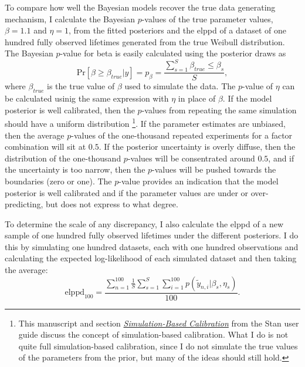 To compare how well the Bayesian models recover the true data generating mechanism, I calculate the Bayesian $p$-values of the true parameter values, $\beta = 1.1$ and $\eta = 1$, from the fitted posteriors and the elppd of a dataset of one hundred fully observed lifetimes generated from the true Weibull distribution. The Bayesian $p$-value for beta is easily calculated using the posterior draws as \citep{BDA2020}
\begin{equation*}
    \text{Pr}\left[\beta \ge \beta_{true}|y\right] = p_{\beta} = \frac{\sum^{S}_{s = 1}{\beta_{true} \le \beta_s}}{S},
\end{equation*}
where $\beta_{true}$ is the true value of $\beta$ used to simulate the data. The $p$-value of $\eta$ can be calculated usinig the same expression with $\eta$ in place of $\beta$. If the model posterior is well calibrated, then the $p$-values from repeating the same simulation should have a uniform distribution \citep{talts2018, stan_user_guide2024}\footnote{This manuscript and section \href{https://mc-stan.org/docs/stan-users-guide/simulation-based-calibration.html}{\textit{Simulation-Based Calibration}} from the Stan user guide discuss the concept of simulation-based calibration. What I do is not quite full simulation-based calibration, since I do not simulate the true values of the parameters from the prior, but many of the ideas should still hold.}. If the parameter estimates are unbiased, then the average $p$-values of the one-thousand repeated experiments for a factor combination will sit at $0.5$. If the posterior uncertainty is overly diffuse, then the distribution of the one-thousand $p$-values will be consentrated around $0.5$, and if the uncertainty is too narrow, then the $p$-values will be pushed towards the boundaries (zero or one). The $p$-value provides an indication that the model posterior is well calibrated and if the parameter values are under or over-predicting, but does not express to what degree.

To determine the scale of any discrepancy, I also calculate the elppd of a new sample of one hundred fully observed lifetimes under the different posteriors. I do this by simulating one hundred datasets, each with one hundred observations and calculating the expected log-likelihood of each simulated dataset and then taking the average:
\begin{equation*}
    \label{eq:elppd-100}
    \text{elppd}_{100} = \frac{\sum_{n = 1}^{100}\frac{1}{S}\sum_{s = 1}^{S}\sum_{i = 1}^{100}p(\tilde{y}_{n, i}|\beta_s, \eta_s)}{100}.
\end{equation*}

